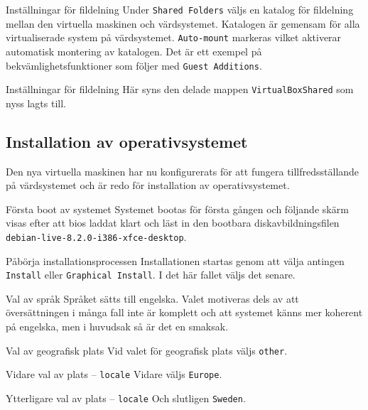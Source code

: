            {Inställningar för fildelning}
           {Under \texttt{Shared Folders} väljs en katalog för fildelning mellan den
            virtuella maskinen och värdsystemet. Katalogen är gemensam för alla
            virtualiserade system på värdsystemet. \texttt{Auto-mount} markeras vilket
            aktiverar automatisk montering av katalogen. Det är ett exempel på
            bekvämlighetsfunktioner som följer med \texttt{Guest Additions}.}
           {}

           {Inställningar för fildelning}
           {Här syns den delade mappen \texttt{VirtualBoxShared} som nyss lagts till.}
           {}

\subsection{Installation av operativsystemet}
Den nya virtuella maskinen har nu konfigurerats för att fungera
tillfredsställande på värdsystemet och är redo för installation av
operativsystemet.

           {Första boot av systemet}
           {Systemet bootas för första gången och följande skärm visas efter att
            bios laddat klart och läst in den bootbara diskavbildningsfilen
            \texttt{debian-live-8.2.0-i386-xfce-desktop}.}
           {}

           {Påbörja installationsprocessen}
           {Installationen startas genom att välja antingen \texttt{Install} eller
            \texttt{Graphical Install}. I det här fallet väljs det senare.}
           {}

           {Val av språk}
           {Språket sätts till engelska. Valet motiveras dels av att
            översättningen i många fall inte är komplett och att systemet
            känns mer koherent på engelska, men i huvudsak så är
            det en smaksak.}
           {}

           {Val av geografisk plats}
           {Vid valet för geografisk plats väljs \texttt{other}.}
           {}

           {Vidare val av plats -- \texttt{locale}}
           {Vidare väljs \texttt{Europe}.}
           {}

           {Ytterligare val av plats -- \texttt{locale}}
           {Och slutligen \texttt{Sweden}.}
           {}

